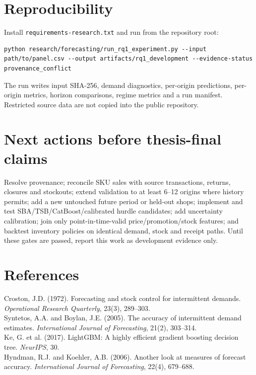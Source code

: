 \documentclass[11pt,a4paper]{article}
\begin{document}
\section{Reproducibility}
Install \texttt{requirements-research.txt} and run from the repository root:
\begin{verbatim}
python research/forecasting/run_rq1_experiment.py --input path/to/panel.csv --output artifacts/rq1_development --evidence-status provenance_conflict
\end{verbatim}
The run writes input SHA-256, demand diagnostics, per-origin predictions, per-origin metrics, horizon comparisons, regime metrics and a run manifest. Restricted source data are not copied into the public repository.

\section{Next actions before thesis-final claims}
Resolve provenance; reconcile SKU sales with source transactions, returns, closures and stockouts; extend validation to at least 6--12 origins where history permits; add a new untouched future period or held-out shops; implement and test SBA/TSB/CatBoost/calibrated hurdle candidates; add uncertainty calibration; join only point-in-time-valid price/promotion/stock features; and backtest inventory policies on identical demand, stock and receipt paths. Until these gates are passed, report this work as development evidence only.

\section*{References}
Croston, J.D. (1972). Forecasting and stock control for intermittent demands. \emph{Operational Research Quarterly}, 23(3), 289--303.\\
Syntetos, A.A. and Boylan, J.E. (2005). The accuracy of intermittent demand estimates. \emph{International Journal of Forecasting}, 21(2), 303--314.\\
Ke, G. et al. (2017). LightGBM: A highly efficient gradient boosting decision tree. \emph{NeurIPS}, 30.\\
Hyndman, R.J. and Koehler, A.B. (2006). Another look at measures of forecast accuracy. \emph{International Journal of Forecasting}, 22(4), 679--688.
\end{document}

